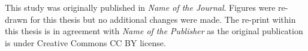 \noindent\colorbox{clrt1!15}{\parbox{\textwidth}{
This study was originally published in \textit{Name of the Journal}.
Figures were re-drawn for this thesis but no additional changes were made.
The re-print within this thesis is in agreement with \textit{Name of the Publisher} as the original publication is under Creative Commons CC BY license.

}}


